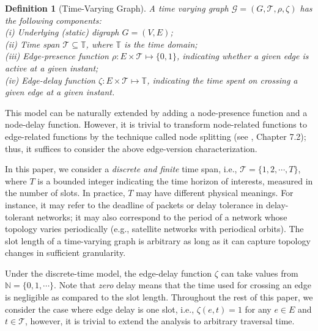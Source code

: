 \documentclass[10pt, conference, letterpaper]{IEEEtran}
\newtheorem{definition}{Definition}
\begin{document}
\begin{definition}[{Time-Varying Graph}]\label{def_time}
A time varying graph $\mathcal{G}=(G,\mathcal{T},\rho,\zeta)$ has the following components: \\
(i) Underlying (static) digraph $G=(V,E)$;\\
(ii) Time span $\mathcal{T}\subseteq \mathbb{T}$, where $\mathbb{T}$ is the time domain;\\
(iii) Edge-presence function $\rho: E\times \mathcal{T}\mapsto \{0,1\}$, indicating whether a given edge is active at a given instant; \\
(iv)  Edge-delay function $\zeta: E\times \mathcal{T}\mapsto \mathbb{T}$, indicating the time spent on crossing a given edge at
a given instant.
\end{definition}


\noindent This model can be naturally extended by adding a node-presence function and a node-delay function. However, it is trivial to transform node-related functions to edge-related functions by the technique called node splitting (see \cite{LP}, Chapter 7.2); thus, it suffices to consider the above edge-version characterization.

In this paper, we consider a \emph{discrete and finite} time span, i.e., $\mathcal{T}=\{1,2,\cdots,T\}$, where $T$ is a bounded integer indicating the time horizon of interests, measured in the number of slots. In practice, $T$ may have different physical meanings. For instance, it may refer to the deadline of packets or delay tolerance in delay-tolerant networks; it may also correspond to the period of a network whose topology varies periodically (e.g., satellite networks with periodical orbits). The slot length of a time-varying graph is arbitrary as long as it can capture topology changes in sufficient granularity.


Under the discrete-time model, the edge-delay function $\zeta$ can take values from $\mathbb{N}=\{0,1,\cdots\}$. Note that \emph{zero} delay means that the time used for crossing an edge is negligible as compared to the slot length.
Throughout the rest of this paper, we consider the case where edge delay is one slot, i.e., $\zeta(e,t)=1$ for any $e\in E$ and $t\in \mathcal{T}$, however, it is trivial to extend the analysis to arbitrary traversal time.
\end{document}
